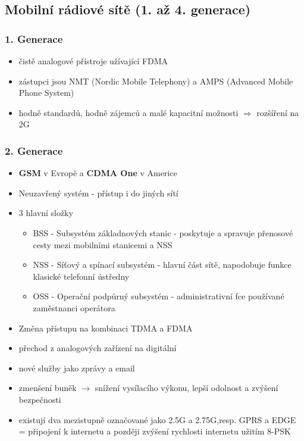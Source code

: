 \documentclass[10pt,a4paper]{article}
\begin{document}
\subsection{Mobilní rádiové sítě (1. až 4. generace)}
\subsubsection{1. Generace}

\begin{itemize}
\item čistě analogové přístroje užívající FDMA
\item zástupci jsou NMT (Nordic Mobile Telephony) a AMPS (Advanced Mobile Phone System)
\item hodně standardů, hodně zájemců a malé kapacitní možnosti $\Rightarrow$ rozšíření na 2G
\end{itemize}
\subsubsection{2. Generace}

\begin{itemize}
\item \textbf{GSM} v Evropě a \textbf{CDMA One} v Americe
\item Neuzavřený systém - přístup i do jiných sítí
\item 3 hlavní složky
\begin{itemize}
\item BSS - Subsystém základnových stanic - poskytuje a spravuje přenosové cesty mezi mobilními stanicemi a NSS
\item NSS - Síťový a spínací subsystém - hlavní část sítě, napodobuje funkce klasické telefonní ústředny
\item OSS - Operační podpůrný subsystém - administrativní fce používané zaměstnanci operátora
\end{itemize}
\item Změna přístupu na kombinaci TDMA a FDMA
\item přechod z analogových zařízení na digitální
\item nové služby jako zprávy a email
\item zmenšení buněk $\rightarrow$ snížení vysílacího výkonu, lepší odolnost a zvýšení bezpečnosti
\item existují dva mezistupně označované jako 2.5G a 2.75G,resp. GPRS a EDGE = připojení k internetu a později zvýšení rychlosti internetu užitím 8-PSK
\end{itemize}
\end{document}
